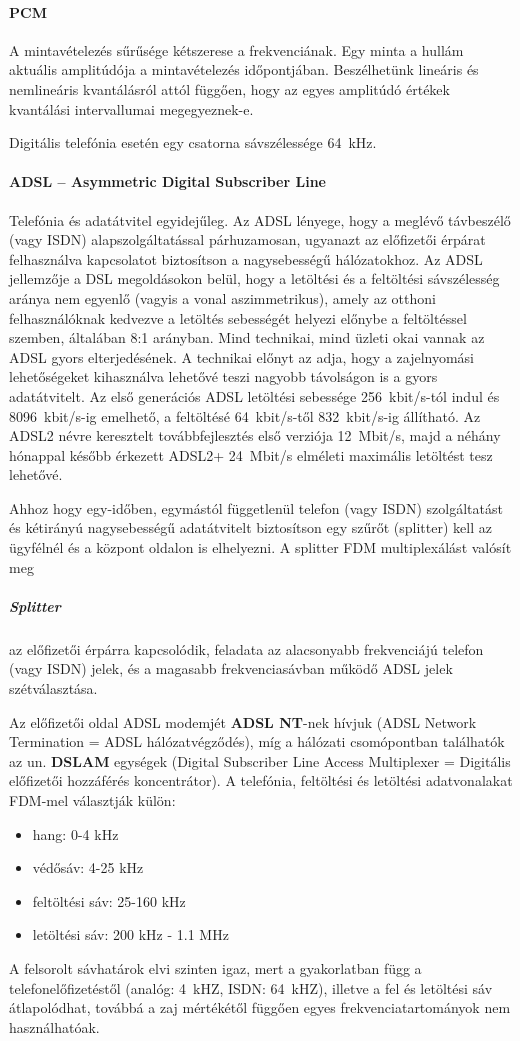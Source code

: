 \paragraph{PCM} A mintavételezés sűrűsége kétszerese a frekvenciának. Egy minta a hullám aktuális amplitúdója a mintavételezés időpontjában. Beszélhetünk lineáris és nemlineáris kvantálásról attól függően, hogy az egyes amplitúdó értékek kvantálási intervallumai megegyeznek-e.

Digitális telefónia esetén egy csatorna sávszélessége 64~kHz.

\paragraph{ADSL -- Asymmetric Digital Subscriber Line} Telefónia és adatátvitel egyidejűleg. Az ADSL lényege, hogy a meglévő távbeszélő (vagy ISDN) alapszolgáltatással párhuzamosan, ugyanazt az előfizetői érpárat felhasználva kapcsolatot biztosítson a nagysebességű hálózatokhoz.
Az ADSL jellemzője a DSL megoldásokon belül, hogy a letöltési és a feltöltési sávszélesség aránya nem egyenlő (vagyis a vonal aszimmetrikus), amely az otthoni felhasználóknak kedvezve a letöltés sebességét helyezi előnybe a feltöltéssel szemben, általában 8:1 arányban. Mind technikai, mind üzleti okai vannak az ADSL gyors elterjedésének. A technikai előnyt az adja, hogy a zajelnyomási lehetőségeket kihasználva lehetővé teszi nagyobb távolságon is a gyors adatátvitelt. Az első generációs ADSL letöltési sebessége 256~kbit/s-tól indul és 8096~kbit/s-ig emelhető, a feltöltésé 64~kbit/s-től 832~kbit/s-ig állítható. Az ADSL2 névre keresztelt továbbfejlesztés első verziója 12~Mbit/s, majd a néhány hónappal később érkezett ADSL2+ 24~Mbit/s elméleti maximális letöltést tesz lehetővé.

Ahhoz hogy egy-időben, egymástól függetlenül telefon (vagy ISDN) szolgáltatást és kétirányú nagysebességű adatátvitelt biztosítson egy szűrőt (splitter) kell az ügyfélnél és a központ oldalon is elhelyezni. A splitter FDM multiplexálást valósít meg
\subparagraph{Splitter} az előfizetői érpárra kapcsolódik, feladata az alacsonyabb frekvenciájú telefon (vagy ISDN) jelek, és a magasabb frekvenciasávban működő ADSL jelek szétválasztása.

Az előfizetői oldal ADSL modemjét \textbf{ADSL NT}-nek hívjuk (ADSL Network Termination = ADSL hálózatvégződés), míg a hálózati csomópontban találhatók az un. \textbf{DSLAM} egységek (Digital Subscriber Line Access Multiplexer = Digitális előfizetői hozzáférés koncentrátor). A telefónia, feltöltési és letöltési adatvonalakat FDM-mel választják külön:
\begin{itemize}[nosep]
	\item hang: 0-4 kHz
	\item védősáv: 4-25 kHz
	\item feltöltési sáv: 25-160 kHz
	\item letöltési sáv: 200 kHz - 1.1 MHz
\end{itemize}
A felsorolt sávhatárok elvi szinten igaz, mert a gyakorlatban függ a telefonelőfizetéstől (analóg: 4~kHZ, ISDN: 64~kHZ), illetve a fel és letöltési sáv átlapolódhat, továbbá a zaj mértékétől függően egyes frekvenciatartományok nem használhatóak.

